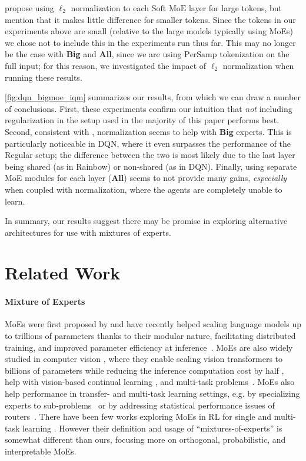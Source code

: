 \documentclass{article}
\theoremstyle{plain}
\theoremstyle{definition}
\theoremstyle{remark}
\newcommand{\softmoe}{$\textrm{Soft MoE}$}
\newcommand{\token}[1]{$\textrm{#1}$}
\begin{document}
\citet{puigcerver2023sparse} propose using $\ell_2$ normalization to each \softmoe{} layer for large tokens, but mention that it makes little difference for smaller tokens. Since the tokens in our experiments above are small (relative to the large models typically using MoEs) we chose not to include this in the experiments run thus far. This may no longer be the case with {\bf Big} and {\bf All}, since we are using \token{PerSamp} tokenization on the full input; for this reason, we investigated the impact of $\ell_2$ normalization when running these results. 

\cref{fig:dqn_bigmoe_iqm} summarizes our results, from which we can draw a number of conclusions. First, these experiments confirm our intuition that {\em not} including regularization in the setup used in the majority of this paper performs best. Second, consistent with \citet{puigcerver2023sparse},  normalization seems to help with {\bf Big} experts. This is particularly noticeable in DQN, where it even surpasses the performance of the Regular setup; the difference between the two is most likely due to the last layer being shared (as in Rainbow) or non-shared (as in DQN). Finally, using separate MoE modules for each layer ({\bf All}) seems to not provide many gains, {\em especially} when coupled with normalization, where the agents are completely unable to learn.

In summary, our results suggest there may be promise in exploring alternative architectures for use with mixtures of experts.

\section{Related Work}
\label{sec:related_work}

\paragraph{Mixture of Experts} MoEs were first proposed by \citet{jacobs1991adaptive} and have recently helped scaling language models up to trillions of parameters thanks to their modular nature, facilitating distributed training, and improved parameter efficiency at inference~\citep{lepikhin2020gshard,fedus2022switch}.
MoEs are also widely studied in computer vision \cite{wang2020deep,yang2019condconv,abbas2020biased,pavlitskaya2020using}, where they enable scaling vision transformers to billions of parameters while reducing the inference computation cost by half \citep{riquelme2021scaling}, help with vision-based continual learning \citep{lee2019neural}, and multi-task problems~\citep{fan2022m3vit}.   
MoEs also help performance in transfer- and multi-task learning settings, e.g. by specializing experts to sub-problems~\citep{puigcerver2020scalable, chen2023mod, ye2023taskexpert} or by addressing statistical performance issues of routers~\citep{hazimeh2021dselect}.
There have been few works exploring MoEs in RL for single \citep{ren21probabilistic, akrour22continuous} and multi-task learning \citep{hendawy2024multitask}. However their definition and usage of ``mixtures-of-experts'' is somewhat different than ours, focusing more on orthogonal, probabilistic, and interpretable MoEs.
\end{document}
